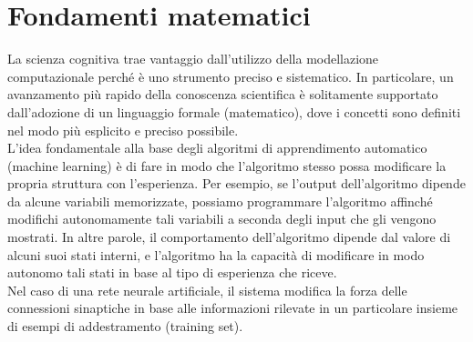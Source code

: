 \section{Fondamenti matematici}

La scienza cognitiva 
trae vantaggio dall'utilizzo della modellazione computazionale perché 
è uno strumento preciso e sistematico. 
In particolare, un avanzamento più rapido della conoscenza scientifica è
solitamente supportato dall'adozione di un linguaggio formale (matematico), dove
i concetti sono definiti nel modo più esplicito e preciso possibile.\\
L'idea fondamentale alla base degli algoritmi di apprendimento automatico
(machine learning) è di fare in modo che l'algoritmo stesso possa modificare la
propria struttura con l'esperienza. Per esempio, se l'output dell'algoritmo
dipende da alcune variabili memorizzate, possiamo programmare l'algoritmo
affinché modifichi autonomamente tali variabili a seconda degli input che gli
vengono mostrati. In altre parole, il comportamento dell'algoritmo dipende dal
valore di alcuni suoi stati interni, e l'algoritmo ha la capacità di modificare
in modo autonomo tali stati in base al tipo di esperienza che riceve.\\
Nel caso di una rete neurale artificiale, il sistema modifica la forza delle
connessioni sinaptiche in base alle informazioni rilevate in un particolare
insieme di esempi di addestramento (training set). 
